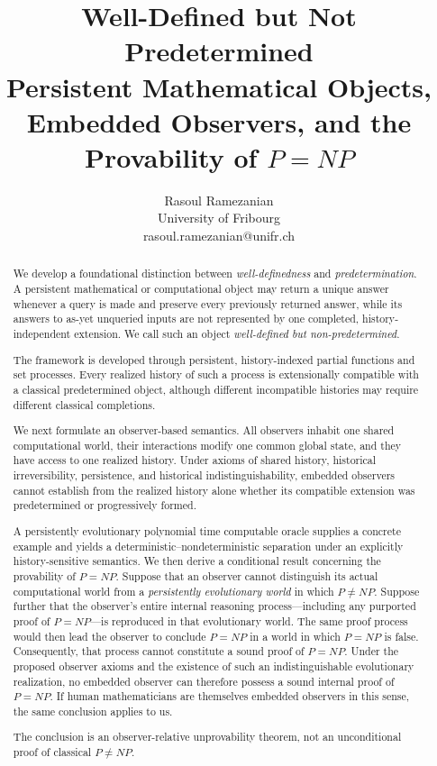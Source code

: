 \documentclass[11pt]{article}
\title{\textbf{Well-Defined but Not Predetermined}\\
\large Persistent Mathematical Objects, Embedded Observers, and the Provability of \(P=NP\)}
\author{Rasoul Ramezanian\\ \small University of Fribourg \\ \small rasoul.ramezanian@unifr.ch}
\date{}
\begin{document}
\maketitle

\begin{abstract} 
We develop a foundational distinction between \emph{well-definedness} and
\emph{predetermination}.  A persistent mathematical or computational object may return a
unique answer whenever a query is made and preserve every previously returned answer, while
its answers to as-yet unqueried inputs are not represented by one completed,
history-independent extension.  We call such an object \emph{well-defined but
non-predetermined}.

The framework is developed through persistent, history-indexed partial functions and set
processes.  Every realized history of such a process is extensionally compatible with a
classical predetermined object, although different incompatible histories may require
different classical completions.   

We next formulate an observer-based semantics.  All observers inhabit one shared
computational world, their interactions modify one common global state, and they have access
to one realized history.  Under axioms of shared history, historical irreversibility, persistence, and
historical indistinguishability, embedded observers cannot establish from the realized
history alone whether its compatible extension was predetermined or progressively formed.

A persistently evolutionary polynomial time computable oracle supplies a concrete example and yields a
deterministic--nondeterministic separation under an explicitly history-sensitive
  semantics.  We then derive a conditional result concerning the provability of \(P=NP\). Suppose that an observer cannot distinguish its actual computational world from a \textit{persistently evolutionary world} in which \(P\neq NP\). Suppose further that the observer's entire internal reasoning process—including any purported proof of \(P=NP\)—is reproduced in that evolutionary world. The same proof process would then lead the observer to conclude \(P=NP\) in a world in which \(P=NP\) is false. Consequently, that process cannot constitute a sound proof of \(P=NP\). Under the proposed observer axioms and the existence of such an indistinguishable evolutionary realization, no embedded observer can therefore possess a sound internal proof of \(P=NP\). If human mathematicians are themselves embedded observers in this sense, the same conclusion applies to us.


The conclusion is an observer-relative unprovability theorem, not an unconditional proof of
classical \(P\neq NP\). 
\end{abstract}
\end{document}
